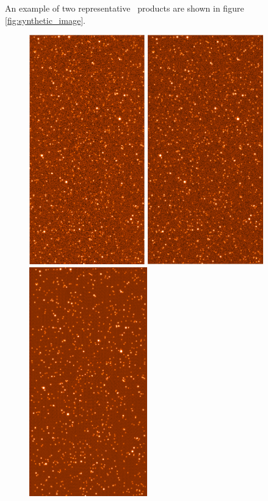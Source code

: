 An example of two representative \hdrlresample\ products are shown in figure \ref{fig:synthetic_image}.

\begin{figure}[H]
\centering
\includegraphics[width=5cm]{figures/synthetic_stars_gal_bkgd_1.png} 
\includegraphics[width=5cm]{figures/hdrldemo_resample_DRIZZLE_single_3.png} 
\includegraphics[width=5.115cm]{figures/hdrldemo_resample_DRIZZLE_coadd_3.png} 

\end{figure}
